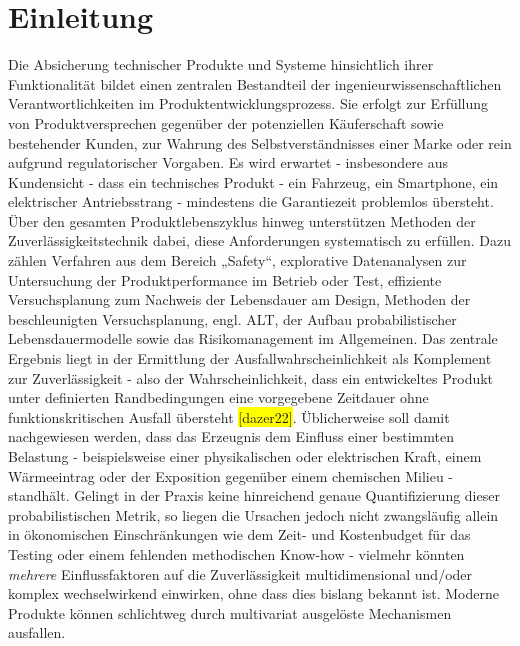 
\chapter{Einleitung}
Die Absicherung technischer Produkte und Systeme hinsichtlich ihrer Funktionalität bildet einen zentralen Bestandteil der ingenieurwissenschaftlichen Verantwortlichkeiten im Produktentwicklungsprozess.
Sie erfolgt zur Erfüllung von Produktversprechen gegenüber der potenziellen Käuferschaft sowie bestehender Kunden, zur Wahrung des Selbstverständnisses einer Marke oder rein aufgrund regulatorischer Vorgaben.
Es wird erwartet - insbesondere aus Kundensicht - dass ein technisches Produkt - ein Fahrzeug, ein Smartphone, ein elektrischer Antriebsstrang - mindestens die Garantiezeit problemlos übersteht.\\
Über den gesamten Produktlebenszyklus hinweg unterstützen Methoden der Zuverlässigkeitstechnik dabei, diese Anforderungen systematisch zu erfüllen.
Dazu zählen Verfahren aus dem Bereich „Safety“, explorative Datenanalysen zur Untersuchung der Produktperformance im Betrieb oder Test, effiziente Versuchsplanung zum Nachweis der Lebensdauer am Design, Methoden der beschleunigten Versuchsplanung, engl. \ac{ALT}, der Aufbau probabilistischer Lebensdauermodelle sowie das Risikomanagement im Allgemeinen.
Das zentrale Ergebnis liegt in der Ermittlung der Ausfallwahrscheinlichkeit als Komplement zur Zuverlässigkeit - also der Wahrscheinlichkeit, dass ein entwickeltes Produkt unter definierten Randbedingungen eine vorgegebene Zeitdauer ohne funktionskritischen Ausfall übersteht \colorbox{yellow}{[dazer22]}.
Üblicherweise soll damit nachgewiesen werden, dass das Erzeugnis dem Einfluss einer bestimmten Belastung - beispielsweise einer physikalischen oder elektrischen Kraft, einem Wärmeeintrag oder der Exposition gegenüber einem chemischen Milieu - standhält.
Gelingt in der Praxis keine hinreichend genaue Quantifizierung dieser probabilistischen Metrik, so liegen die Ursachen jedoch nicht zwangsläufig allein in ökonomischen Einschränkungen wie dem Zeit- und Kostenbudget für das Testing oder einem fehlenden methodischen Know-how - vielmehr könnten  \textit{mehrere} Einflussfaktoren auf die Zuverlässigkeit multidimensional und/oder komplex wechselwirkend einwirken, ohne dass dies bislang bekannt ist.
Moderne Produkte können schlichtweg durch multivariat ausgelöste Mechanismen ausfallen.

